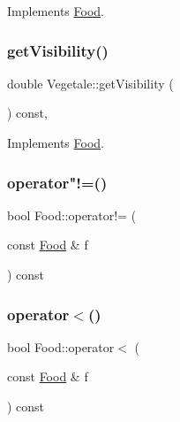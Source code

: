 Implements \hyperlink{classFood_a9bafe4a8c954c8e99395f25c19cc3eed_a9bafe4a8c954c8e99395f25c19cc3eed}{Food}.

\mbox{\label{classVegetale_a4e4528535441df5619648d279ad81306_a4e4528535441df5619648d279ad81306}} 
\subsubsection{\texorpdfstring{get\+Visibility()}{getVisibility()}}
{\footnotesize\ttfamily double Vegetale\+::get\+Visibility (\begin{DoxyParamCaption}{ }\end{DoxyParamCaption}) const\hspace{0.3cm}{\ttfamily [override]}, {\ttfamily [virtual]}}



Implements \hyperlink{classFood_a81af14eff9dc5ce73dae309f04b20ccd_a81af14eff9dc5ce73dae309f04b20ccd}{Food}.

\mbox{\label{classFood_abf50e88ce6cc0db8c43dfb42d2978b01_abf50e88ce6cc0db8c43dfb42d2978b01}} 
\subsubsection{\texorpdfstring{operator"!=()}{operator!=()}}
{\footnotesize\ttfamily bool Food\+::operator!= (\begin{DoxyParamCaption}\item[{const \hyperlink{classFood}{Food} \&}]{f }\end{DoxyParamCaption}) const\hspace{0.3cm}{\ttfamily [inherited]}}

\mbox{\label{classFood_ac0c1ef5c9608080ae7e0bbb6375f92ce_ac0c1ef5c9608080ae7e0bbb6375f92ce}} 
\subsubsection{\texorpdfstring{operator$<$()}{operator<()}}
{\footnotesize\ttfamily bool Food\+::operator$<$ (\begin{DoxyParamCaption}\item[{const \hyperlink{classFood}{Food} \&}]{f }\end{DoxyParamCaption}) const\hspace{0.3cm}{\ttfamily [inherited]}}

